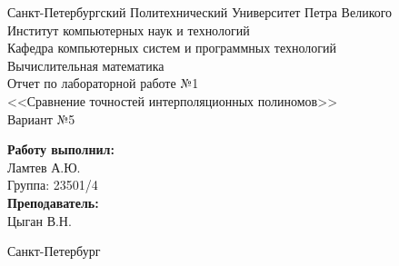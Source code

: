 \begin{titlepage}	%

	\begin{center}		%

		\large Санкт-Петербургский Политехнический Университет Петра Великого\\
		\large Институт компьютерных наук и технологий \\
		\large Кафедра компьютерных систем и программных технологий\\[6cm]
		
		\huge Вычислительная математика\\[0.5cm] %
		\large Отчет по лабораторной работе №1\\[0.1cm]
		\large <<Сравнение точностей интерполяционных полиномов>>\\[0.1cm]
		\large Вариант №5\\[5cm]

	\end{center}


	\begin{flushright} %
		\begin{minipage}{0.25\textwidth} %
			\begin{flushleft} %

				\large\textbf{Работу выполнил:}\\
				\large Ламтев А.Ю.\\
				\large {Группа:} 23501/4\\
				
				\large \textbf{Преподаватель:}\\
				\large Цыган В.Н.

			\end{flushleft}
		\end{minipage}
	\end{flushright}
	
	\vfill %

	\begin{center}
	\large Санкт-Петербург\\
	\large \the\year %
	\end{center} %

\thispagestyle{empty} %
\end{titlepage} %

\vfill %
